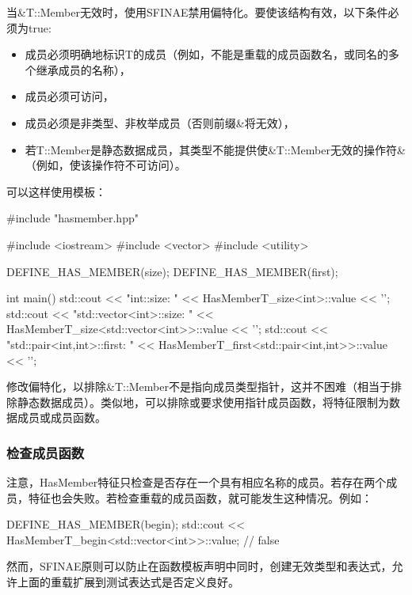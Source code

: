 当\&T::Member无效时，使用SFINAE禁用偏特化。要使该结构有效，以下条件必须为true:

\begin{itemize}
\item
成员必须明确地标识T的成员（例如，不能是重载的成员函数名，或同名的多个继承成员的名称），

\item
成员必须可访问，

\item
成员必须是非类型、非枚举成员（否则前缀\&将无效），

\item
若T::Member是静态数据成员，其类型不能提供使\&T::Member无效的操作符\&（例如，使该操作符不可访问）。
\end{itemize}

可以这样使用模板：

\begin{cpp}
#include "hasmember.hpp"

#include <iostream>
#include <vector>
#include <utility>

DEFINE_HAS_MEMBER(size);
DEFINE_HAS_MEMBER(first);

int main()
{
	std::cout << "int::size: "
				<< HasMemberT_size<int>::value << '\n';
	std::cout << "std::vector<int>::size: "
				<< HasMemberT_size<std::vector<int>>::value << '\n';
	std::cout << "std::pair<int,int>::first: "
				<< HasMemberT_first<std::pair<int,int>>::value << '\n';
}
\end{cpp}

修改偏特化，以排除\&T::Member不是指向成员类型指针，这并不困难（相当于排除静态数据成员）。类似地，可以排除或要求使用指针成员函数，将特征限制为数据成员或成员函数。

\subsubsection{检查成员函数}

注意，HasMember特征只检查是否存在一个具有相应名称的成员。若存在两个成员，特征也会失败。若检查重载的成员函数，就可能发生这种情况。例如：

\begin{cpp}
DEFINE_HAS_MEMBER(begin);
std::cout << HasMemberT_begin<std::vector<int>>::value; // false
\end{cpp}

然而，SFINAE原则可以防止在函数模板声明中同时，创建无效类型和表达式，允许上面的重载扩展到测试表达式是否定义良好。

